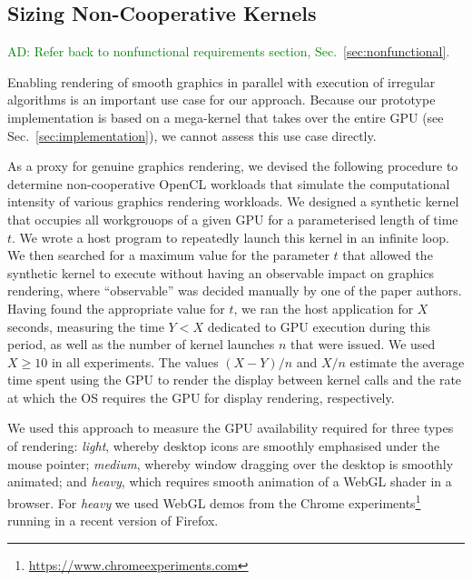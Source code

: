 \documentclass[numbers,nocopyrightspace,10pt]{sigplanconf}
\newcommand{\ADComment}[1]{\textcolor{green}{AD: #1}}
\newcommand{\mysec}{Sec.~}
\begin{document}
\subsection{Sizing Non-Cooperative Kernels}\label{sec:sizingnoncoop}

\ADComment{Refer back to nonfunctional requirements section, \mysec\ref{sec:nonfunctional}.}

Enabling rendering of smooth graphics in parallel with execution of irregular algorithms is an important use case for our approach.  Because our prototype implementation is based on a mega-kernel that takes over the entire GPU (see \mysec\ref{sec:implementation}), we cannot assess this use case directly.

As a proxy for genuine graphics rendering, we devised the following
procedure to determine non-cooperative OpenCL workloads that simulate
the computational intensity of various graphics rendering workloads.
%
We designed a synthetic kernel that occupies all workgrouops of a
given GPU for a parameterised length of time $t$.  We wrote a host
program to repeatedly launch this kernel in an infinite loop.  We then
searched for a maximum value for the parameter $t$ that allowed the
synthetic kernel to execute without having an observable impact on
graphics rendering, where ``observable'' was decided manually by one
of the paper authors.  Having found the appropriate value for $t$, we
ran the host application for $X$ seconds, measuring the time $Y < X$
dedicated to GPU execution during this period, as well as the number
of kernel launches $n$ that were issued.  We used $X \geq 10$ in all
experiments.  The values $(X-Y)/n$ and $X/n$ estimate the average time
spent using the GPU to render the display between kernel calls and the
rate at which the OS requires the GPU for display rendering,
respectively.

We used this approach to measure the GPU availability required for three
types of rendering: \emph{light}, whereby desktop icons are smoothly
emphasised under the mouse pointer; \emph{medium}, whereby window
dragging over the desktop is smoothly animated; and \emph{heavy}, which
requires smooth animation of a WebGL shader in a browser.  For
\emph{heavy} we used WebGL demos from the Chrome
experiments\footnote{\url{https://www.chromeexperiments.com}} running
in a recent version of Firefox.

\end{document}
